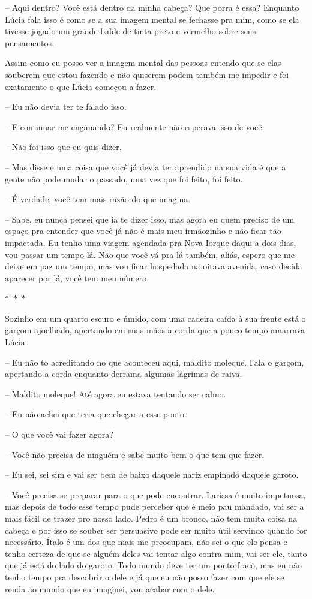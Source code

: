 -- Aqui dentro? Você está dentro da minha cabeça? Que porra é essa? Enquanto Lúcia fala isso é como se a sua imagem mental se fechasse pra mim, como se ela tivesse jogado um grande balde de tinta preto e vermelho sobre seus pensamentos.

Assim como eu posso ver a imagem mental das pessoas entendo que se elas souberem que estou fazendo e não quiserem podem também me impedir e foi exatamente o que Lúcia começou a fazer.

-- Eu não devia ter te falado isso.

-- E continuar me enganando? Eu realmente não esperava isso de você.

-- Não foi isso que eu quis dizer.

-- Mas disse e uma coisa que você já devia ter aprendido na sua vida é que a gente não pode mudar o passado, uma vez que foi feito, foi feito.

-- É verdade, você tem mais razão do que imagina.

-- Sabe, eu nunca pensei que ia te dizer isso, mas agora eu quem preciso de um espaço pra entender que você já não é mais meu irmãozinho e não ficar tão impactada. Eu tenho uma viagem agendada pra Nova Iorque daqui a dois dias, vou passar um tempo lá. Não que você vá pra lá também, aliás, espero que me deixe em paz um tempo, mas vou ficar hospedada na oitava avenida, caso decida aparecer por lá, você tem meu número.

\begin{center}
    $\ast$~$\ast$~$\ast$
\end{center}

Sozinho em um quarto escuro e úmido, com uma cadeira caída à sua frente está o garçom ajoelhado, apertando em suas mãos a corda que a pouco tempo amarrava Lúcia.

-- Eu não to acreditando no que aconteceu aqui, maldito moleque. Fala o garçom, apertando a corda enquanto derrama algumas lágrimas de raiva.

-- Maldito moleque! Até agora eu estava tentando ser calmo.

-- Eu não achei que teria que chegar a esse ponto.

-- O que você vai fazer agora?

-- Você não precisa de ninguém e sabe muito bem o que tem que fazer.

-- Eu sei, sei sim e vai ser bem de baixo daquele nariz empinado daquele garoto.

-- Você precisa se preparar para o que pode encontrar. Larissa é muito impetuosa, mas depois de todo esse tempo pude perceber que é meio pau mandado, vai ser a mais fácil de trazer pro nosso lado. Pedro é um bronco, não tem muita coisa na cabeça e por isso se souber ser persuasivo pode ser muito útil servindo quando for necessário. Ítalo é um dos que mais me preocupam, não sei o que ele pensa e tenho certeza de que se alguém deles vai tentar algo contra mim, vai ser ele, tanto que já está do lado do garoto. Todo mundo deve ter um ponto fraco, mas eu não tenho tempo pra descobrir o dele e já que eu não posso fazer com que ele se renda ao mundo que eu imaginei, vou acabar com o dele.

